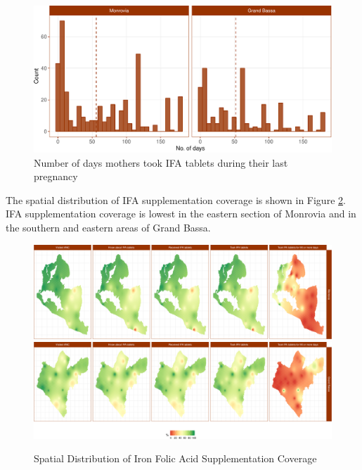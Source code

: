 \documentclass[12pt,a4paper]{article}
\theoremstyle{definition}
\theoremstyle{definition}
\theoremstyle{definition}
\theoremstyle{remark}
\begin{document}
\begin{figure}[H]

{\centering \includegraphics{liberiaCoverageReport_files/figure-latex/ifa5-1} 

}

\caption{Number of days mothers took IFA tablets during their last pregnancy}\label{fig:ifa5}
\end{figure}

The spatial distribution of IFA supplementation coverage is shown in
Figure \ref{fig:ifaMap1}. IFA supplementation coverage is lowest in the
eastern section of Monrovia and in the southern and eastern areas of
Grand Bassa.

\begin{figure}[H]

{\centering \includegraphics{liberiaCoverageReport_files/figure-latex/ifaMap1-1} \includegraphics{liberiaCoverageReport_files/figure-latex/ifaMap1-2} 

}

\caption{Spatial Distribution of Iron Folic Acid Supplementation Coverage}\label{fig:ifaMap1}
\end{figure}
\end{document}
